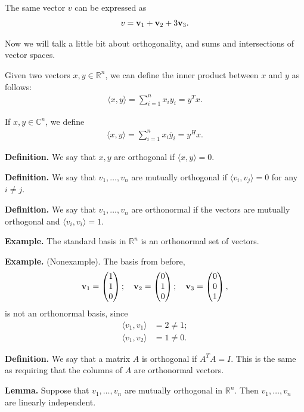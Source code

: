 \documentclass{article}
\newcommand{\mat}[1]{\begin{pmatrix}#1\end{pmatrix}}
\newcommand{\la}{\langle}
\newcommand{\ra}{\rangle}
\newcommand{\ol}{\overline}
\begin{document}
The same vector $v$ can be expressed as
\begin{align*}
  v = \mathbf{v}_1 + \mathbf{v}_2 + 3 \mathbf{v}_3.
\end{align*}

Now we will talk a little bit about orthogonality, and sums and intersections of vector spaces.

Given two vectors $x, y \in \mathbb{R}^n$, we can define the inner product between $x$ and $y$ as follows:
\begin{align*}
  \la x, y \ra = \sum_{i=1}^{n} x_i y_i = y^T x.
\end{align*}

If $x, y \in \mathbb{C}^n$, we define
\begin{align*}
  \la x, y \ra = \sum_{i=1}^{n} x_i \ol{y}_i = y^H x.
\end{align*}

{\bf Definition.} We say that $x, y$ are orthogonal if $\la x, y \ra = 0$.

{\bf Definition.} We say that $v_1, \dots, v_n$ are mutually orthogonal if $\la v_i, v_j \ra = 0$ for any $i \neq j$.

{\bf Definition.} We say that $v_1, \dots, v_n$ are orthonormal if the vectors are mutually orthogonal and $\la v_i, v_i \ra = 1$.

{\bf Example.} The standard basis in $\mathbb{R}^n$ is an orthonormal set of vectors.

{\bf Example.} (Nonexample).  The basis from before,
\begin{align*}
  \mbf{v}_1 = \mat{1 \\ 1 \\ 0}; \quad \mbf{v}_2 = \mat{0 \\ 1 \\ 0}; \quad \mbf{v}_3 = \mat{0 \\ 0 \\ 1},
\end{align*}
is not an orthonormal basis, since
\begin{align*}
  \la v_1, v_1 \ra &= 2 \neq 1; \\
  \la v_1, v_2 \ra &= 1 \neq 0.
\end{align*}

{\bf Definition.} We say that a matrix $A$ is orthogonal if $A^T A = I$.  This is the same as requiring that the columns of $A$ are orthonormal vectors.

{\bf Lemma.} Suppose that $v_1, \dots, v_n$ are mutually orthogonal in $\mathbb{R}^n$.  Then $v_1, \dots, v_n$ are linearly independent.
\end{document}
